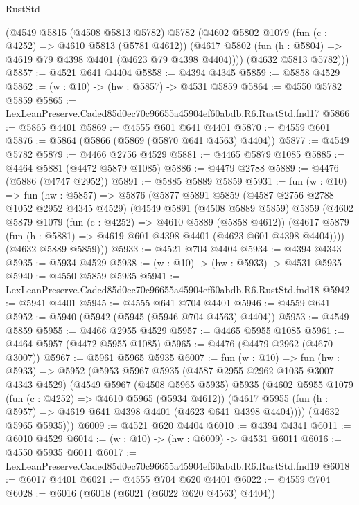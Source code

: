 \begin{lexlean}{RustStd}
\begin{coremodule}
      (@4549
        @5815
        (@4508 @5813 @5782)
        @5782
        (@4602
          @5802
          @1079
          (fun (c : @4252) => @4610 @5813 (@5781 @4612))
          (@4617 @5802 (fun (h : @5804) => @4619 @79 @4398 @4401 (@4623 @79 @4398 @4404))))
        (@4632 @5813 @5782)))
@5857 := @4521 @641 @4404
@5858 := @4394 @4345
@5859 := @5858 @4529
@5862 := (w : @10) -> (hw : @5857) -> @4531 @5859
@5864 := @4550 @5782 @5859
@5865 := LexLeanPreserve.Caded85d0ec70c96655a45904ef60abdb.R6.RustStd.fnd17
@5866 := @5865 @4401
@5869 := @4555 @601 @641 @4401
@5870 := @4559 @601
@5876 := @5864 (@5866 (@5869 (@5870 @641 @4563) @4404))
@5877 := @4549 @5782
@5879 := @4466 @2756 @4529
@5881 := @4465 @5879 @1085
@5885 := @4464 @5881 (@4472 @5879 @1085)
@5886 := @4479 @2788
@5889 := @4476 (@5886 (@4747 @2952))
@5891 := @5885 @5889 @5859
@5931 := fun (w : @10) =>
  fun (hw : @5857) =>
  @5876
    (@5877
      @5891
      @5859
      (@4587 @2756 @2788 @1052 @2952 @4345 @4529)
      (@4549
        @5891
        (@4508 @5889 @5859)
        @5859
        (@4602
          @5879
          @1079
          (fun (c : @4252) => @4610 @5889 (@5858 @4612))
          (@4617 @5879 (fun (h : @5881) => @4619 @601 @4398 @4401 (@4623 @601 @4398 @4404))))
        (@4632 @5889 @5859)))
@5933 := @4521 @704 @4404
@5934 := @4394 @4343
@5935 := @5934 @4529
@5938 := (w : @10) -> (hw : @5933) -> @4531 @5935
@5940 := @4550 @5859 @5935
@5941 := LexLeanPreserve.Caded85d0ec70c96655a45904ef60abdb.R6.RustStd.fnd18
@5942 := @5941 @4401
@5945 := @4555 @641 @704 @4401
@5946 := @4559 @641
@5952 := @5940 (@5942 (@5945 (@5946 @704 @4563) @4404))
@5953 := @4549 @5859
@5955 := @4466 @2955 @4529
@5957 := @4465 @5955 @1085
@5961 := @4464 @5957 (@4472 @5955 @1085)
@5965 := @4476 (@4479 @2962 (@4670 @3007))
@5967 := @5961 @5965 @5935
@6007 := fun (w : @10) =>
  fun (hw : @5933) =>
  @5952
    (@5953
      @5967
      @5935
      (@4587 @2955 @2962 @1035 @3007 @4343 @4529)
      (@4549
        @5967
        (@4508 @5965 @5935)
        @5935
        (@4602
          @5955
          @1079
          (fun (c : @4252) => @4610 @5965 (@5934 @4612))
          (@4617 @5955 (fun (h : @5957) => @4619 @641 @4398 @4401 (@4623 @641 @4398 @4404))))
        (@4632 @5965 @5935)))
@6009 := @4521 @620 @4404
@6010 := @4394 @4341
@6011 := @6010 @4529
@6014 := (w : @10) -> (hw : @6009) -> @4531 @6011
@6016 := @4550 @5935 @6011
@6017 := LexLeanPreserve.Caded85d0ec70c96655a45904ef60abdb.R6.RustStd.fnd19
@6018 := @6017 @4401
@6021 := @4555 @704 @620 @4401
@6022 := @4559 @704
@6028 := @6016 (@6018 (@6021 (@6022 @620 @4563) @4404))

\end{coremodule}
\end{lexlean}
